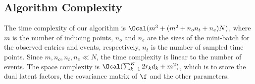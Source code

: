 \subsection{Algorithm Complexity}
The time complexity of our algorithm is $\Ocal(m^3 + (m^2 + n_on_t + n_e) N)$, where $m$ is the number of inducing points, $n_o$ and $n_e$ are the sizes of the mini-batch for the observed entries and events, respectively, $n_t$ is the number of sampled time points. Since $m, n_o, n_t, n_e \ll N$, the time complexity is linear to the number of events. The space complexity is $\Ocal(\sum_{k=1}^K 2r_k d_k + m^2)$, which is to store the dual latent factors, the covariance matrix of $\f$ and the other parameters. 
